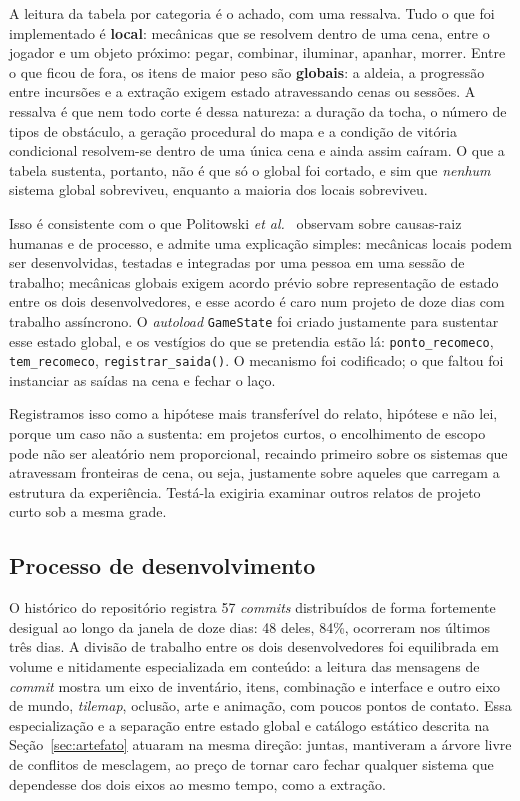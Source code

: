 \documentclass[conference]{IEEEtran}
\begin{document}
A leitura da tabela por categoria é o achado, com uma ressalva. Tudo o que foi
implementado é \textbf{local}: mecânicas que se resolvem dentro de uma cena, entre o
jogador e um objeto próximo: pegar, combinar, iluminar, apanhar, morrer. Entre o que
ficou de fora, os itens de maior peso são \textbf{globais}: a aldeia, a progressão entre
incursões e a extração exigem estado atravessando cenas ou sessões. A ressalva é que nem
todo corte é dessa natureza: a duração da tocha, o número de tipos de obstáculo, a
geração procedural do mapa e a condição de vitória condicional resolvem-se dentro de uma
única cena e ainda assim caíram. O que a tabela sustenta, portanto, não é que só o
global foi cortado, e sim que \emph{nenhum} sistema global sobreviveu, enquanto a
maioria dos locais sobreviveu.

Isso é consistente com o que Politowski \textit{et al.}~\cite{politowski2021} observam
sobre causas-raiz humanas e de processo, e admite uma explicação simples: mecânicas
locais podem ser desenvolvidas, testadas e integradas por uma pessoa em uma sessão de
trabalho; mecânicas globais exigem acordo prévio sobre representação de estado entre os
dois desenvolvedores, e esse acordo é caro num projeto de doze dias com trabalho
assíncrono. O \textit{autoload} \texttt{GameState} foi criado justamente para sustentar
esse estado global, e os vestígios do que se pretendia estão lá:
\texttt{ponto\_recomeco}, \texttt{tem\_recomeco}, \texttt{registrar\_saida()}. O
mecanismo foi codificado; o que faltou foi instanciar as saídas na cena e fechar o laço.

Registramos isso como a hipótese mais transferível do relato, hipótese e não lei, porque
um caso não a sustenta: em projetos curtos, o encolhimento de escopo pode não ser
aleatório nem proporcional, recaindo primeiro sobre os sistemas que atravessam
fronteiras de cena, ou seja, justamente sobre aqueles que carregam a estrutura da
experiência. Testá-la exigiria examinar outros relatos de projeto curto sob a mesma
grade.

\subsection{Processo de desenvolvimento}

O histórico do repositório registra 57 \textit{commits} distribuídos de forma fortemente
desigual ao longo da janela de doze dias: 48 deles, 84\%, ocorreram nos últimos três
dias. A divisão de trabalho entre os dois desenvolvedores foi equilibrada em volume e
nitidamente especializada em conteúdo: a leitura das mensagens de \textit{commit} mostra
um eixo de inventário, itens, combinação e interface e outro eixo de mundo,
\textit{tilemap}, oclusão, arte e animação, com poucos pontos de contato. Essa
especialização e a separação entre estado global e catálogo estático descrita na
Seção~\ref{sec:artefato} atuaram na mesma direção: juntas, mantiveram a árvore livre de
conflitos de mesclagem, ao preço de tornar caro fechar qualquer sistema que dependesse
dos dois eixos ao mesmo tempo, como a extração.
\end{document}
